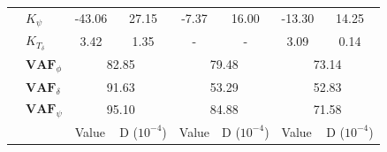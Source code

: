 \begin{table}[]
\begin{tabular}{llcccccc}
                                 & $K_\psi $             & -43.06                                     & 27.15                                              & -7.37                                      & 16.00                                              & -13.30                                     & 14.25                                              \\
                                 & $K_{T_\delta}$        & 3.42                                       & 1.35                                               & -                                          & -                                                  & 3.09                                       & 0.14                                               \\ \cline{2-8} 
                                 & $\mathbf{VAF}_\phi$   & \multicolumn{2}{c}{82.85}                                                                       & \multicolumn{2}{c}{79.48}                                                                       & \multicolumn{2}{c}{73.14}                                                                       \\
                                 & $\mathbf{VAF}_\delta$ & \multicolumn{2}{c}{91.63}                                                                       & \multicolumn{2}{c}{53.29}                                                                       & \multicolumn{2}{c}{52.83}                                                                       \\
                                 & $\mathbf{VAF}_\psi$   & \multicolumn{2}{c}{95.10}                                                                       & \multicolumn{2}{c}{84.88}                                                                       & \multicolumn{2}{c}{71.58}                                                                       \\ \hline
                                 &                       & \multicolumn{1}{l}{\multirow{2}{*}{Value}} & \multicolumn{1}{l}{\multirow{2}{*}{D ($10^{-4}$)}} & \multicolumn{1}{l}{\multirow{2}{*}{Value}} & \multicolumn{1}{l}{\multirow{2}{*}{D ($10^{-4}$)}} & \multicolumn{1}{l}{\multirow{2}{*}{Value}} & \multicolumn{1}{l}{\multirow{2}{*}{D ($10^{-4}$)}} \\
                                 &                       & \multicolumn{1}{l}{}                       & \multicolumn{1}{l}{}                               & \multicolumn{1}{l}{}                       & \multicolumn{1}{l}{}                               & \multicolumn{1}{l}{}                       & \multicolumn{1}{l}{}                               \\ \cline{3-8} 

\end{tabular}
\end{table}
